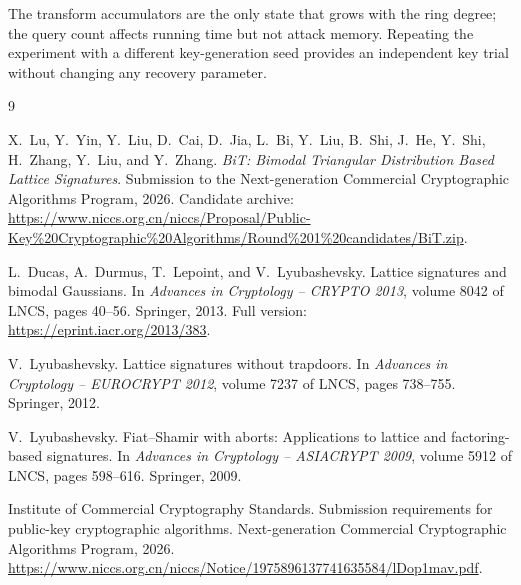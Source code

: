 \documentclass[11pt,a4paper]{article}
\begin{document}
The transform accumulators are the only state that grows with the ring degree;
the query count affects running time but not attack memory.  Repeating the
experiment with a different key-generation seed provides an independent key
trial without changing any recovery parameter.

\begin{thebibliography}{9}

X.~Lu, Y.~Yin, Y.~Liu, D.~Cai, D.~Jia, L.~Bi, Y.~Liu, B.~Shi, J.~He,
Y.~Shi, H.~Zhang, Y.~Liu, and Y.~Zhang.
\newblock \emph{BiT: Bimodal Triangular Distribution Based Lattice Signatures}.
\newblock Submission to the Next-generation Commercial Cryptographic
Algorithms Program, 2026.  Candidate archive:
\url{https://www.niccs.org.cn/niccs/Proposal/Public-Key%20Cryptographic%20Algorithms/Round%201%20candidates/BiT.zip}.

L.~Ducas, A.~Durmus, T.~Lepoint, and V.~Lyubashevsky.
\newblock Lattice signatures and bimodal Gaussians.
\newblock In \emph{Advances in Cryptology -- CRYPTO 2013}, volume 8042 of
LNCS, pages 40--56. Springer, 2013.
\newblock Full version: \url{https://eprint.iacr.org/2013/383}.

V.~Lyubashevsky.
\newblock Lattice signatures without trapdoors.
\newblock In \emph{Advances in Cryptology -- EUROCRYPT 2012}, volume 7237 of
LNCS, pages 738--755. Springer, 2012.

V.~Lyubashevsky.
\newblock Fiat--Shamir with aborts: Applications to lattice and
factoring-based signatures.
\newblock In \emph{Advances in Cryptology -- ASIACRYPT 2009}, volume 5912 of
LNCS, pages 598--616. Springer, 2009.

Institute of Commercial Cryptography Standards.
\newblock Submission requirements for public-key cryptographic algorithms.
\newblock Next-generation Commercial Cryptographic Algorithms Program, 2026.
\newblock \url{https://www.niccs.org.cn/niccs/Notice/1975896137741635584/lDop1mav.pdf}.

\end{thebibliography}
\end{document}
